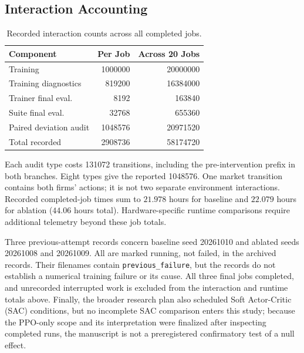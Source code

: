 \subsection{Interaction Accounting}

\begin{table}[t]
\centering
\caption{Recorded interaction counts across all completed jobs.}
\label{tab:interactions}
\small
\begin{tabular}{@{}lrr@{}}
\toprule
Component & Per Job & Across 20 Jobs \\
\midrule
Training              & \num{1000000}  & \num{20000000} \\
Training diagnostics  & \num{819200}   & \num{16384000} \\
Trainer final eval.   & \num{8192}     & \num{163840} \\
Suite final eval.     & \num{32768}    & \num{655360} \\
Paired deviation audit & \num{1048576} & \num{20971520} \\
\midrule
Total recorded        & \num{2908736}  & \num{58174720} \\
\bottomrule
\end{tabular}
\end{table}

Each audit type costs \num{131072} transitions, including the pre-intervention prefix in both branches. Eight types give the reported \num{1048576}. One market transition contains both firms' actions; it is not two separate environment interactions. Recorded completed-job times sum to $21.978$ hours for baseline and $22.079$ hours for ablation ($44.06$ hours total). Hardware-specific runtime comparisons require additional telemetry beyond these job totals.

Three previous-attempt records concern baseline seed 20261010 and ablated seeds 20261008 and 20261009. All are marked running, not failed, in the archived records. Their filenames contain \texttt{previous\_failure}, but the records do not establish a numerical training failure or its cause. All three final jobs completed, and unrecorded interrupted work is excluded from the interaction and runtime totals above. Finally, the broader research plan also scheduled Soft Actor-Critic (SAC) conditions, but no incomplete SAC comparison enters this study; because the PPO-only scope and its interpretation were finalized after inspecting completed runs, the manuscript is not a preregistered confirmatory test of a null effect.

